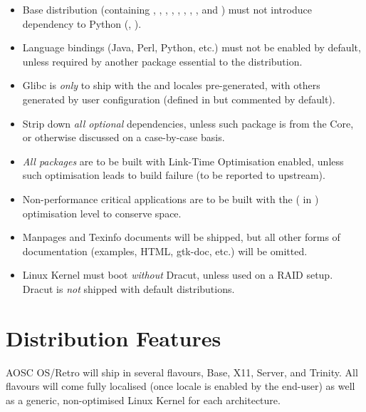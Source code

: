     \begin{itemize}
        \item Base distribution (containing , , , ,
            , , , , and )
            must not introduce dependency to Python (, ).
        \item Language bindings (Java, Perl, Python, etc.) must not be enabled by default,
            unless required by another package essential to the distribution.
        \item Glibc is \textit{only} to ship with the  and  locales pre-generated,
            with others generated by user configuration (defined in  but commented by default).
        \item Strip down \textit{all optional} dependencies, unless such package is from the Core,
            or otherwise discussed on a case-by-case basis.
        \item \textit{All packages} are to be built with Link-Time Optimisation enabled,
            unless such optimisation leads to build failure (to be reported to upstream).
        \item Non-performance critical applications are to be built with the 
            ( in ) optimisation level to conserve space.
        \item Manpages and Texinfo documents will be shipped, but all other forms of documentation
            (examples, HTML, gtk-doc, etc.) will be omitted.
        \item Linux Kernel must boot \textit{without} Dracut, unless used on a RAID setup.
            Dracut is \textit{not} shipped with default distributions.
    \end{itemize}

    \section{Distribution Features}

    AOSC OS/Retro will ship in several flavours, Base, X11, Server, and Trinity.
    All flavours will come fully localised (once locale is enabled by the end-user) as well as a generic,
    non-optimised Linux Kernel for each architecture.

